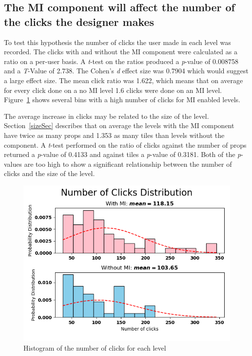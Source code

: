 \documentclass[journal]{IEEEtran}
\begin{document}
\subsection{The MI component will affect the number of the clicks the designer makes}\label{clicks}
To test this hypothesis the number of clicks the user made in each level was recorded. The clicks with and without the MI component were calculated as a ratio on a per-user basis. A \textit{t}-test on the ratios produced a \textit{p}-value of 0.008758 and a \textit{T}-Value of 2.738. The Cohen's \textit{d} effect size was 0.7904 which would suggest a large effect size\cite{cohen1988statistical}. The mean click ratio was 1.622, which means that on average for every click done on a no MI level 1.6 clicks were done on an MI level.  Figure~\ref{clickDist} shows several bins with a high number of clicks for MI enabled levels.

The average increase in clicks may be related to the size of the level. Section~\ref{sizeSec} describes that on average the levels with the MI component have twice as many props and 1.353 as many tiles than levels without the component. A \textit{t}-test performed on the ratio of clicks against the number of props returned a \textit{p}-value of 0.4133 and against tiles a \textit{p}-value of 0.3181. Both of the \textit{p}-values are too high to show a significant relationship between the number of clicks and the size of the level.

\begin{figure}[h]
	\includegraphics[width=1\linewidth]{NumberofClicksDistribution.png}
	\caption{Histogram of the number of clicks for each level}
	\label{clickDist}
\end{figure} 
\end{document}
